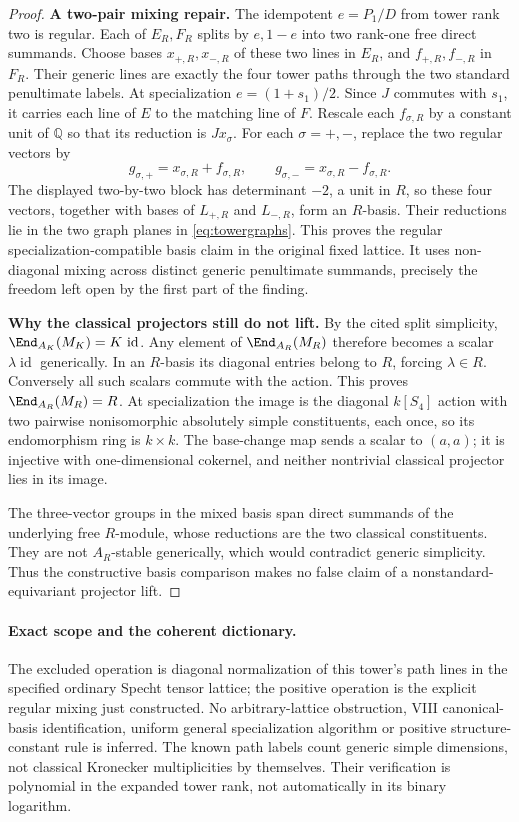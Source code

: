 \documentclass[11pt,a4paper]{article}
\newcommand{\Q}{\mathbb Q}\newcommand{\Z}{\mathbb Z}\newcommand{\C}{\mathbb C}\newcommand{\N}{\mathbb N}\newcommand{\F}{\mathbb F}
\newcommand{\id}{\operatorname{id}}\newcommand{\et}{\mathrm{\acute et}}\newcommand{\boxt}{\boxtimes}
\theoremstyle{named}\newtheorem{finding}{Finding}[section]
\theoremstyle{definition}\newtheorem{definition}[finding]{Definition}
\theoremstyle{remark}\newtheorem{remark}[finding]{Remark}
\begin{document}
\begin{proof}
\par\smallskip\noindent\textbf{A two-pair mixing repair.}\quad
The idempotent $e=P_1/D$ from tower rank two is regular. Each of $E_R,F_R$
splits by $e,1-e$ into two rank-one free direct summands. Choose
bases $x_{+,R},x_{-,R}$ of these two lines in $E_R$, and
$f_{+,R},f_{-,R}$ in $F_R$. Their generic lines are exactly the
four tower paths through the two standard penultimate labels.
At specialization $e=(1+s_1)/2$. Since $J$ commutes with $s_1$,
it carries each line of $E$ to the matching line of $F$. Rescale
each $f_{\sigma,R}$ by a constant unit of $\Q$ so that its
reduction is $Jx_\sigma$.
For each $\sigma=+,-$, replace the two regular vectors by
\[
 g_{\sigma,+}=x_{\sigma,R}+f_{\sigma,R},\qquad
 g_{\sigma,-}=x_{\sigma,R}-f_{\sigma,R}.
\]
The displayed two-by-two block has determinant $-2$, a unit in
$R$, so these four vectors, together with bases of $L_{+,R}$
and $L_{-,R}$, form an $R$-basis. Their reductions lie in the
two graph planes in \eqref{eq:towergraphs}. This proves the
regular specialization-compatible basis claim in the original
fixed lattice. It uses non-diagonal mixing across distinct generic
penultimate summands, precisely the freedom left open by the first
part of the finding.

\par\smallskip\noindent\textbf{Why the classical projectors still do not lift.}\quad
By the cited split simplicity,
$\End_{A_K}(M_K)=K\,\id$. Any element of $\End_{A_R}(M_R)$
therefore becomes a scalar $\lambda\id$ generically. In an
$R$-basis its diagonal entries belong to $R$, forcing $\lambda\in R$.
Conversely all such scalars commute with the action. This proves
$\End_{A_R}(M_R)=R$. At specialization the image is the diagonal
$k[S_4]$ action with two pairwise nonisomorphic absolutely simple
constituents, each once, so its endomorphism ring is $k\times k$.
The base-change map sends a scalar to $(a,a)$; it is injective with
one-dimensional cokernel, and neither nontrivial classical projector
lies in its image.

The three-vector groups in the mixed basis span direct summands of
the underlying free $R$-module, whose reductions are the two
classical constituents. They are not $A_R$-stable generically,
which would contradict generic simplicity. Thus the constructive
basis comparison makes no false claim of a nonstandard-equivariant
projector lift.
\end{proof}

\paragraph{Exact scope and the coherent dictionary.}
The excluded operation is diagonal normalization of this tower's
path lines in the specified ordinary Specht tensor lattice; the
positive operation is the explicit regular mixing just constructed.
No arbitrary-lattice obstruction, VIII canonical-basis identification,
uniform general specialization algorithm or positive structure-constant
rule is inferred. The known path labels count generic simple dimensions,
not classical Kronecker multiplicities by themselves. Their verification
is polynomial in the expanded tower rank, not automatically in its
binary logarithm.
\end{document}
